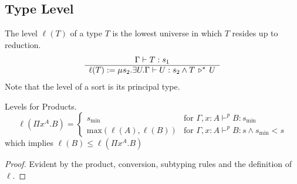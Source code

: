 \subsection{Type Level}


\begin{definition}
  The level $\ell(T)$ of a type $T$ is the lowest universe in which $T$
  resides up to reduction.
  $$
  \begin{array}{c}  \Gamma \vdash T: s_1 \\ \hline  \ell(T) := \mu s_2. \exists U. \Gamma \vdash U:s_2 \land T \,\triangleright^*\, U\end{array}
  $$
  Note that the level of a sort is its principal type.
\end{definition}


\begin{lemma}
  Levels for Products.
  $$
  \ell(\Pi x^A.B) =
  \begin{cases}
    s_\text{min}
    & \text{for } \Gamma,x:A \vdash^p B:s_\text{min}
    \\
    \text{max}(\ell(A), \ell(B))
    & \text{for } \Gamma,x:A \vdash^p B:s \land s_\text{min} < s
  \end{cases}
  $$
  which implies $\ell(B) \le \ell(\Pi x^A.B)$
  \begin{proof} Evident by the product, conversion, subtyping rules and the
    definition of $\ell$.
  \end{proof}
\end{lemma}



